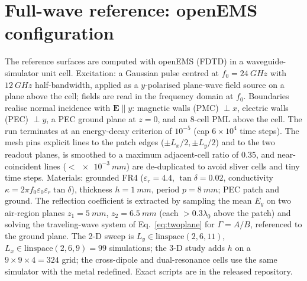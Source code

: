 \documentclass[11pt]{article}
\begin{document}
\section{Full-wave reference: openEMS configuration}\label{app:openems}
The reference surfaces are computed with openEMS (FDTD) in a waveguide-simulator unit cell. Excitation: a
Gaussian pulse centred at $f_0=\SI{24}{GHz}$ with $\SI{12}{GHz}$ half-bandwidth, applied as a
$y$-polarised plane-wave field source on a plane above the cell; fields are read in the frequency domain at
$f_0$. Boundaries realise normal incidence with $\mathbf{E}\parallel y$: magnetic walls (PMC) $\perp x$,
electric walls (PEC) $\perp y$, a PEC ground plane at $z=0$, and an $8$-cell PML above the cell. The run
terminates at an energy-decay criterion of $10^{-5}$ (cap $6\times10^{4}$ time steps). The mesh pins explicit
lines to the patch edges ($\pm L_x/2,\pm L_y/2$) and to the two readout planes, is smoothed to a maximum
adjacent-cell ratio of $0.35$, and near-coincident lines ($<\!\SI{e-3}{mm}$) are de-duplicated to avoid
sliver cells and tiny time steps. Materials: grounded FR4 ($\varepsilon_r=4.4$, $\tan\delta=0.02$,
conductivity $\kappa=2\pi f_0\varepsilon_0\varepsilon_r\tan\delta$), thickness $h=\SI{1}{mm}$, period
$p=\SI{8}{mm}$; PEC patch and ground. The reflection coefficient is extracted by sampling the mean $E_y$ on
two air-region planes $z_1=\SI{5}{mm}$, $z_2=\SI{6.5}{mm}$ (each $>\!0.3\lambda_0$ above the patch) and
solving the traveling-wave system of Eq.~\eqref{eq:twoplane} for $\Gamma=A/B$, referenced to the ground
plane. The 2-D sweep is $L_y\in\mathrm{linspace}(2,6,11)$, $L_x\in\mathrm{linspace}(2,6,9)=99$ simulations;
the 3-D study adds $h$ on a $9\times9\times4=324$ grid; the cross-dipole and dual-resonance cells use the
same simulator with the metal redefined. Exact scripts are in the released repository.
\end{document}
